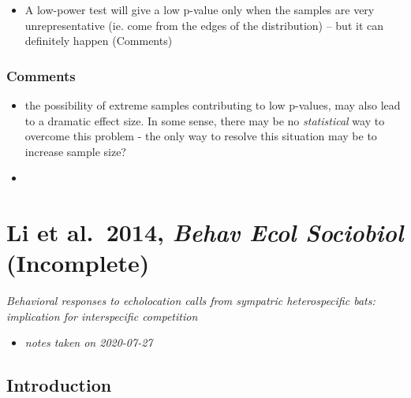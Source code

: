 \documentclass[
]{book}
\providecommand{\tightlist}{%
  \setlength{\itemsep}{0pt}\setlength{\parskip}{0pt}}
\begin{document}
\begin{itemize}
\tightlist
\item
  A low-power test will give a low p-value only when the samples are very unrepresentative (ie. come from the edges of the distribution) -- but it can definitely happen (Comments)
\end{itemize}

\hypertarget{comments-6}{%
\subsection{Comments}\label{comments-6}}

\begin{itemize}
\tightlist
\item
  the possibility of extreme samples contributing to low p-values, may also lead to a dramatic effect size. In some sense, there may be no \emph{statistical} way to overcome this problem - the only way to resolve this situation may be to increase sample size?
\item
\end{itemize}

\hypertarget{li-et-al.-2014-behav-ecol-sociobiol-incomplete}{%
\chapter{\texorpdfstring{Li et al.~2014, \emph{Behav Ecol Sociobiol} (Incomplete)}{Li et al.~2014, Behav Ecol Sociobiol (Incomplete)}}\label{li-et-al.-2014-behav-ecol-sociobiol-incomplete}}


\emph{Behavioral responses to echolocation calls from sympatric heterospecific bats: implication for interspecific competition} \citep{li2014behavioral}

\begin{itemize}
\tightlist
\item
  \emph{notes taken on 2020-07-27}
\end{itemize}

\hypertarget{introduction-7}{%
\section{Introduction}\label{introduction-7}}
\end{document}
